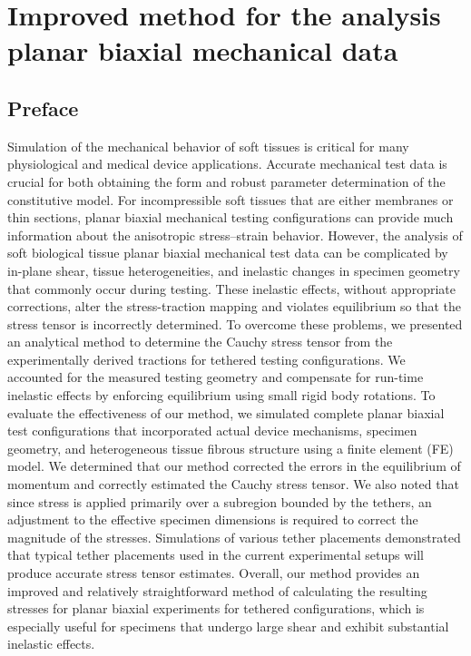 \chapter{Improved method for the analysis planar biaxial mechanical data}

\section*{Preface}
%

Simulation of the mechanical behavior of soft tissues is critical for many physiological and medical device applications. Accurate mechanical test data is crucial for both obtaining the form and robust parameter determination of the constitutive model. For incompressible soft tissues that are either membranes or thin sections, planar biaxial mechanical testing configurations can provide much information about the anisotropic stress–strain behavior. However, the analysis of soft biological tissue planar biaxial mechanical test data can be complicated by in-plane shear, tissue heterogeneities, and inelastic changes in specimen geometry that commonly occur during testing. These inelastic effects, without appropriate corrections, alter the stress-traction mapping and violates equilibrium so that the stress tensor is incorrectly determined. To overcome these problems, we presented an analytical method to determine the Cauchy stress tensor from the experimentally derived tractions for tethered testing configurations. We accounted for the measured testing geometry and compensate for run-time inelastic effects by enforcing equilibrium using small rigid body rotations. To evaluate the effectiveness of our method, we simulated complete planar biaxial test configurations that incorporated actual device mechanisms, specimen geometry, and heterogeneous tissue fibrous structure using a finite element (FE) model. We determined that our method corrected the errors in the equilibrium of momentum and correctly estimated the Cauchy stress tensor. We also noted that since stress is applied primarily over a subregion bounded by the tethers, an adjustment to the effective specimen dimensions is required to correct the magnitude of the stresses. Simulations of various tether placements demonstrated that typical tether placements used in the current experimental setups will produce accurate stress tensor estimates. Overall, our method provides an improved and relatively straightforward method of calculating the resulting stresses for planar biaxial experiments for tethered configurations, which is especially useful for specimens that undergo large shear and exhibit substantial inelastic effects.



